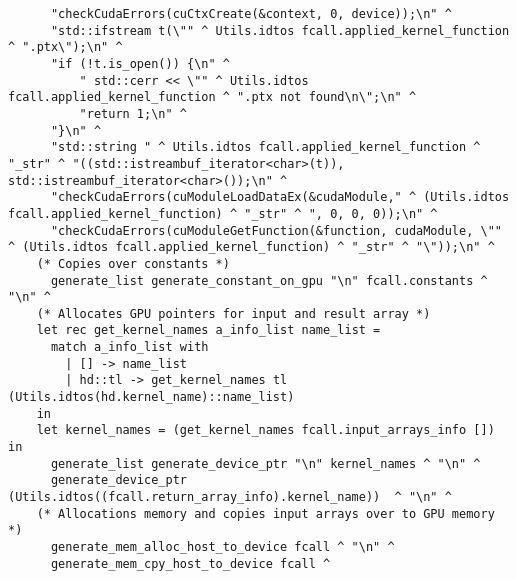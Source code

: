 \begin{verbatim}
      "checkCudaErrors(cuCtxCreate(&context, 0, device));\n" ^ 
      "std::ifstream t(\"" ^ Utils.idtos fcall.applied_kernel_function ^ ".ptx\");\n" ^ 
      "if (!t.is_open()) {\n" ^
          " std::cerr << \"" ^ Utils.idtos fcall.applied_kernel_function ^ ".ptx not found\n\";\n" ^
          "return 1;\n" ^
      "}\n" ^
      "std::string " ^ Utils.idtos fcall.applied_kernel_function ^ "_str" ^ "((std::istreambuf_iterator<char>(t)), std::istreambuf_iterator<char>());\n" ^ 
      "checkCudaErrors(cuModuleLoadDataEx(&cudaModule," ^ (Utils.idtos fcall.applied_kernel_function) ^ "_str" ^ ", 0, 0, 0));\n" ^ 
      "checkCudaErrors(cuModuleGetFunction(&function, cudaModule, \"" ^ (Utils.idtos fcall.applied_kernel_function) ^ "_str" ^ "\"));\n" ^ 
    (* Copies over constants *)
      generate_list generate_constant_on_gpu "\n" fcall.constants ^ "\n" ^
    (* Allocates GPU pointers for input and result array *)
    let rec get_kernel_names a_info_list name_list = 
      match a_info_list with 
        | [] -> name_list 
        | hd::tl -> get_kernel_names tl (Utils.idtos(hd.kernel_name)::name_list) 
    in
    let kernel_names = (get_kernel_names fcall.input_arrays_info []) in
      generate_list generate_device_ptr "\n" kernel_names ^ "\n" ^ 
      generate_device_ptr (Utils.idtos((fcall.return_array_info).kernel_name))  ^ "\n" ^
    (* Allocations memory and copies input arrays over to GPU memory *)
      generate_mem_alloc_host_to_device fcall ^ "\n" ^
      generate_mem_cpy_host_to_device fcall ^


\end{verbatim}
